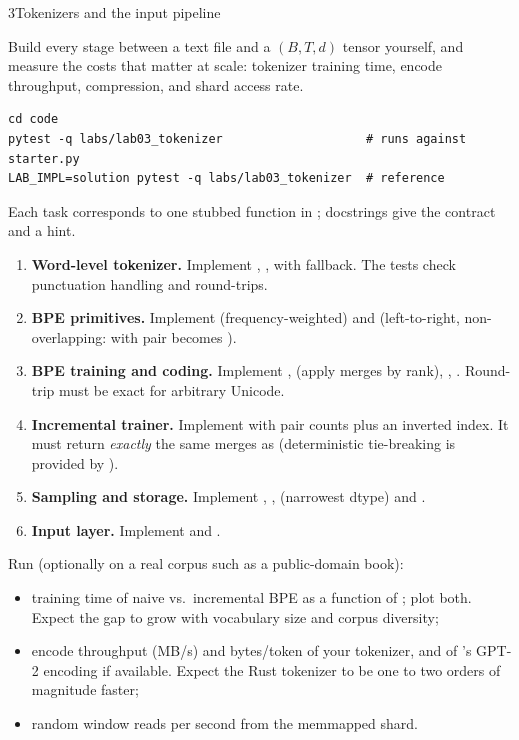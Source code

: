 \begin{labbox}{3}{Tokenizers and the input pipeline}

Build every stage between a text file and a $(B,T,d)$ tensor yourself, and measure the
costs that matter at scale: tokenizer training time, encode throughput, compression, and shard
access rate.

\begin{lstlisting}[style=shell]
cd code
pytest -q labs/lab03_tokenizer                    # runs against starter.py
LAB_IMPL=solution pytest -q labs/lab03_tokenizer  # reference
\end{lstlisting}
Each task corresponds to one stubbed function in ; docstrings give the contract
and a hint.

\begin{enumerate}
  \item \textbf{Word-level tokenizer.} Implement , ,
   with  fallback. The tests check punctuation
  handling and round-trips.
  \item \textbf{BPE primitives.} Implement  (frequency-weighted) and
   (left-to-right, non-overlapping: \code{[1,1,1]} with pair 
  becomes \code{[7,1]}).
  \item \textbf{BPE training and coding.} Implement ,  (apply
  merges by rank), , . Round-trip must be exact for
  arbitrary Unicode.
  \item \textbf{Incremental trainer.} Implement  with pair counts plus an
  inverted index. It must return \emph{exactly} the same merges as 
  (deterministic tie-breaking is provided by ).
  \item \textbf{Sampling and storage.} Implement , ,
   (narrowest dtype) and .
  \item \textbf{Input layer.} Implement  and
  .
\end{enumerate}

Run  (optionally  on a real corpus such as a public-domain book):
\begin{itemize}
  \item training time of naive vs.\ incremental BPE as a function of ; plot both. Expect the
  gap to grow with vocabulary size and corpus diversity;
  \item encode throughput (MB/s) and bytes/token of your tokenizer, and of 's GPT-2
  encoding if available. Expect the Rust tokenizer to be one to two orders of magnitude faster;
  \item random window reads per second from the memmapped shard.
\end{itemize}


\end{labbox}
